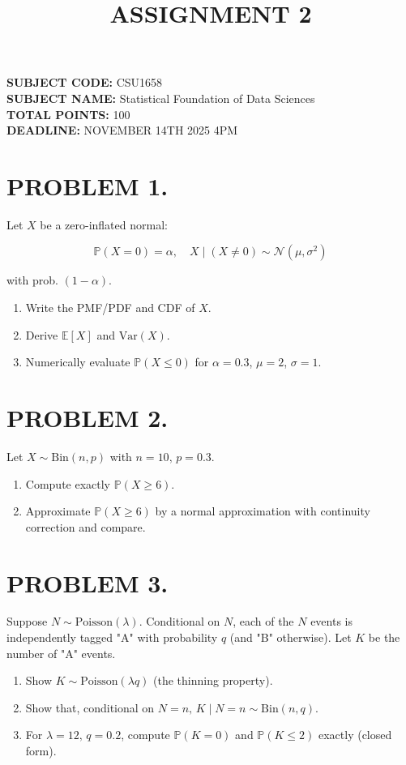 \documentclass[12pt]{article}
\title{ASSIGNMENT 2}
\author{}
\date{}
\begin{document}
\maketitle

\noindent
\textbf{SUBJECT CODE:} CSU1658 \\
\textbf{SUBJECT NAME:} Statistical Foundation of Data Sciences \\
\textbf{TOTAL POINTS:} 100 \\
\textbf{DEADLINE:} NOVEMBER 14TH 2025 4PM

\section*{PROBLEM 1.}

Let \( X \) be a zero-inflated normal:

\[\mathbb{P}(X = 0) = \alpha, \quad X \mid (X \neq 0) \sim \mathcal{N}(\mu, \sigma^2)\]

with prob. \((1 - \alpha)\).

\begin{enumerate}
\item Write the PMF/PDF and CDF of \( X \).
\item Derive \(\mathbb{E}[X]\) and \(\text{Var}(X)\).
\item Numerically evaluate \(\mathbb{P}(X \leq 0)\) for \(\alpha = 0.3\), \(\mu = 2\), \(\sigma = 1\).
\end{enumerate}

\section*{PROBLEM 2.}

Let \( X \sim \text{Bin}(n, p) \) with \( n = 10, \, p = 0.3 \).
\begin{enumerate}
\item Compute exactly \(\mathbb{P}(X \geq 6)\).
\item Approximate \(\mathbb{P}(X \geq 6)\) by a normal approximation with continuity correction and compare.
\end{enumerate}

\section*{PROBLEM 3.}

Suppose \( N \sim \text{Poisson}(\lambda) \). Conditional on \( N \), each of the \( N \) events is independently tagged "A" with probability \( q \) (and "B" otherwise). Let \( K \) be the number of "A" events.
\begin{enumerate}
\item Show \( K \sim \text{Poisson}(\lambda q) \) (the thinning property).
\item Show that, conditional on \( N = n, \, K \mid N = n \sim \text{Bin}(n, q) \).
\item For \( \lambda = 12, \, q = 0.2 \), compute \(\mathbb{P}(K = 0)\) and \(\mathbb{P}(K \leq 2)\) exactly (closed form).
\end{enumerate}
\end{document}
